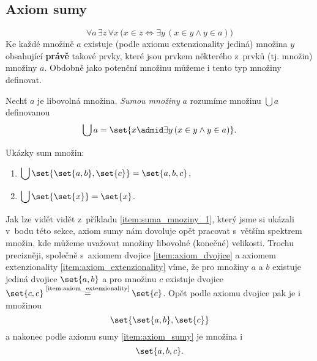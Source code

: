 \subsection{Axiom sumy}
\begin{equation*}
    \forall a\,\exists z\,\forall x\,\bigl(x\in z\iff \exists y\,(x\in y \land y\in a)\bigr)
\end{equation*}
Ke každé množině $a$ existuje (podle axiomu extenzionality jediná) množina $y$ obsahující \textbf{právě} takové prvky, které jsou prvkem některého z~prvků (tj. množin) množiny $a$. Obdobně jako potenční množinu můžeme i tento typ množiny definovat.
\begin{definition}
    Nechť $a$ je libovolná množina. \emph{Sumou množiny} $a$ rozumíme množinu $\bigcup a$ definovanou
    \begin{equation*}
        \bigcup a=\set{x \admid \exists y\,(x\in y \land y\in a)}.
    \end{equation*}
\end{definition}
\begin{example}\label{ex:sumy_mnozin}
    Ukázky sum množin:
    \begin{enumerate}[label=(\roman*)]
        \item\label{item:suma_mnoziny_1} $\displaystyle\bigcup\set{\set{a,b},\set{c}}=\set{a,b,c}$,
        \item\label{item:suma_mnoziny_2} $\displaystyle\bigcup\set{\set{x}}=\set{x}$.
    \end{enumerate}
\end{example}
Jak lze vidět vidět z~příkladu \ref{item:suma_mnoziny_1}, který jsme si ukázali v~bodu této sekce, axiom sumy nám dovoluje opět pracovat s~větším spektrem množin, kde můžeme uvažovat množiny libovolné (konečné) velikosti. Trochu precizněji, společně s~axiomem dvojice \ref{item:axiom_dvojice} a axiomem extenzionality \ref{item:axiom_extenzionality} víme, že pro množiny $a$ a $b$ existuje jediná dvojice $\set{a,b}$ a pro množinu $c$ existuje dvojice $\set{c,c}\stackrel{\text{\ref{item:axiom_extenzionality}}}{=}\set{c}$. Opět podle axiomu dvojice pak je i množinou
\begin{equation*}
    \set{\set{a,b},\set{c}}
\end{equation*}
a nakonec podle axiomu sumy \ref{item:axiom_sumy} je množina i
\begin{equation*}
    \set{a,b,c}.
\end{equation*}
\medskip

